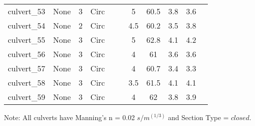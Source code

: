 \begin{table}[]
\begin{tabular}{@{}lcccccccccc@{}}
culvert\_53   & None       & 3        & Circ &        &       & 5        & 60.5   & 3.8       & 3.6        \\
culvert\_54   & None       & 2        & Circ &        &       & 4.5      & 60.2   & 3.5       & 3.8        \\
culvert\_55   & None       & 3        & Circ &        &       & 5        & 62.8   & 4.1       & 4.2        \\
culvert\_56   & None       & 3        & Circ &        &       & 4        & 61     & 3.6       & 3.6        \\
culvert\_57   & None       & 3        & Circ &        &       & 4        & 60.7   & 3.4       & 3.3        \\
culvert\_58   & None       & 3        & Circ &        &       & 3.5      & 61.5   & 4.1       & 4.1        \\
culvert\_59   & None       & 3        & Circ &        &       & 4        & 62     & 3.8       & 3.9        \\
\bottomrule
\end{tabular}
Note: All culverts have Manning's n = 0.02 $s/m^{(1/3)}$ and Section Type = $closed$.
\end{table}
\clearpage

